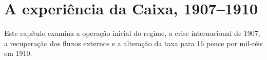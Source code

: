 \chapter{A experiência da Caixa, 1907--1910}

Este capítulo examina a operação inicial do regime, a crise internacional de 1907, a recuperação dos fluxos externos e a alteração da taxa para 16 pence por mil-réis em 1910.


